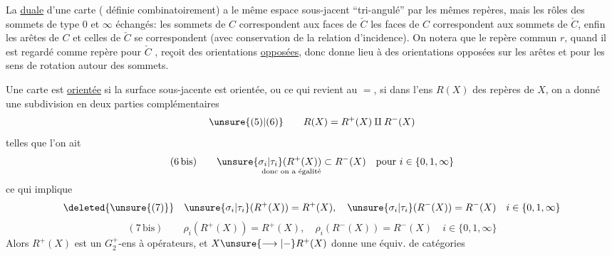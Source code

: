 

La   \uline{duale} d'une carte ( définie combinatoirement) a le même espace sous-jacent ``tri-angulé'' par les mêmes repères, mais les rôles des sommets de type $0$ et $\infty$ échangés: les sommets de $C$ correspondent aux faces de $\check C$   les faces de $C$ correspondent aux sommets de $\check C$, enfin les arêtes de $C$ et celles de $\check C$ se correspondent (avec conservation de la relation d'incidence). On notera que le repère commun $r$,  quand il est  regardé comme repère pour $\check C$  , reçoit des orientations \uline{opposées}, donc donne lieu à des orientations opposées sur les arêtes et pour les sens de rotation autour des sommets.

Une carte  est \uline{orientée} si la surface sous-jacente est orientée, ou ce qui revient au $=$, si dans l'ens $R(X)$ des repères de $X$, on a donné une subdivision en deux parties complémentaires
\[
\unsure{(5)|(6)}\qquad R(X)=R^+(X)\amalg R^-(X)
\]
telles que l'on ait
\[
(6\,\mathrm{bis})\qquad
\underset{\text{donc on a égalité}}{\unsure{\sigma_i|\tau_i}(R^+(X))\subset R^-(X)}
\quad\text{pour }i\in\{0,1,\infty\}
\]
ce qui implique
\[
\deleted{\unsure{(7)}}\quad
\unsure{\sigma_i|\tau_i}(R^+(X))=R^+(X),\quad
\unsure{\sigma_i|\tau_i}(R^-(X))=R^-(X)
\quad i\in\{0,1,\infty\}
\]
\[
(7\,\mathrm{bis})\qquad
\rho_i(R^+(X))=R^+(X),\quad\rho_i(R^-(X))=R^-(X)
\quad i\in\{0,1,\infty\}
\]
Alors  $R^+(X)$ est un $G_2^+$-ens à opérateurs, et
$X\unsure{\longrightarrow|{-}}R^+(X)$ donne une équiv. de catégories


